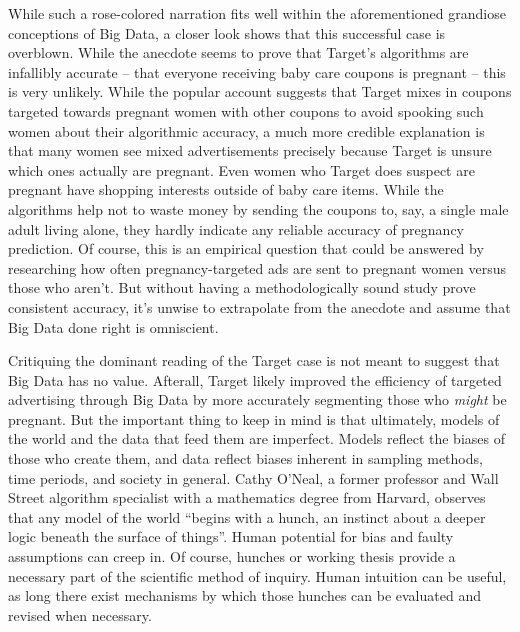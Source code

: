 \documentclass[sigconf]{acmart}
\begin{document}
While such a rose-colored narration fits well within the aforementioned grandiose conceptions of Big Data, a closer look shows that this successful case is overblown. While the anecdote seems to prove that Target's algorithms are infallibly accurate -- that everyone receiving baby care coupons is pregnant -- this is very unlikely. While the popular account suggests that Target mixes in coupons targeted towards pregnant women with other coupons to avoid spooking such women about their algorithmic accuracy, a much more credible explanation is that many women see mixed advertisements precisely because Target is unsure which ones actually are pregnant\cite{Harford2014}. Even women who Target does suspect are pregnant have shopping interests outside of baby care items. While the algorithms help not to waste money by sending the coupons to, say, a single male adult living alone, they hardly indicate any reliable accuracy of pregnancy prediction. Of course, this is an empirical question that could be answered by researching how often pregnancy-targeted ads are sent to pregnant women versus those who aren't. But without having a methodologically sound study prove consistent accuracy, it's unwise to extrapolate from the anecdote and assume that Big Data done right is omniscient.

Critiquing the dominant reading of the Target case is not meant to suggest that Big Data has no value. Afterall, Target likely improved the efficiency of targeted advertising through Big Data by more accurately segmenting those who {\em might} be pregnant. But the important thing to keep in mind is that ultimately, models of the world and the data that feed them are imperfect. Models reflect the biases of those who create them, and data reflect biases inherent in sampling methods, time periods, and society in general. Cathy O'Neal, a former professor and Wall Street algorithm specialist with a mathematics degree from Harvard, observes that any model of the world ``begins with a hunch, an instinct about a deeper logic beneath the surface of things''\cite{Wharton2016}. Human potential for bias and faulty assumptions can creep in. Of course, hunches or working thesis provide a necessary part of the scientific method of inquiry. Human intuition can be useful, as long there exist mechanisms by which those hunches can be evaluated and revised when necessary\cite{Wharton2016}.
\end{document}
